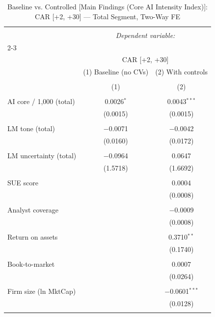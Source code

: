 
\begin{table}[!htbp] \centering 
  \caption{Baseline vs. Controlled [Main Findings (Core AI Intensity Index)]: CAR [+2, +30] — Total Segment, Two-Way FE} 
  \label{} 
\begin{tabular}{@{\extracolsep{5pt}}lcc} 
\\[-1.8ex]\hline 
\hline \\[-1.8ex] 
 & \multicolumn{2}{c}{\textit{Dependent variable:}} \\ 
\cline{2-3} 
\\[-1.8ex] & \multicolumn{2}{c}{CAR [+2, +30]} \\ 
 & (1) Baseline (no CVs) & (2) With controls \\ 
\\[-1.8ex] & (1) & (2)\\ 
\hline \\[-1.8ex] 
 AI core / 1,000 (total) & 0.0026$^{*}$ & 0.0043$^{***}$ \\ 
  & (0.0015) & (0.0015) \\ 
  & & \\ 
 LM tone (total) & $-$0.0071 & $-$0.0042 \\ 
  & (0.0160) & (0.0172) \\ 
  & & \\ 
 LM uncertainty (total) & $-$0.0964 & 0.0647 \\ 
  & (1.5718) & (1.6692) \\ 
  & & \\ 
 SUE score &  & 0.0004 \\ 
  &  & (0.0008) \\ 
  & & \\ 
 Analyst coverage &  & $-$0.0009 \\ 
  &  & (0.0008) \\ 
  & & \\ 
 Return on assets &  & 0.3710$^{**}$ \\ 
  &  & (0.1740) \\ 
  & & \\ 
 Book-to-market &  & 0.0007 \\ 
  &  & (0.0264) \\ 
  & & \\ 
 Firm size (ln MktCap) &  & $-$0.0601$^{***}$ \\ 
  &  & (0.0128) \\ 
  & & \\ 

\end{tabular}
\end{table}
